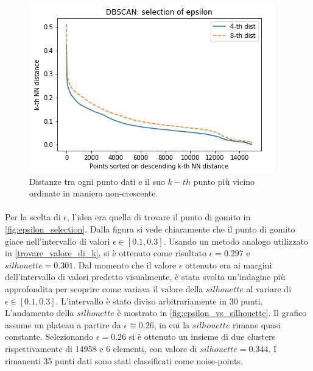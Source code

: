 \documentclass[a4paper]{article}
\begin{document}
\begin{figure}[hbtp]
\centering
\includegraphics[width=0.45\columnwidth]{../images/dbscan_epsilon_selection.png}
\caption{Distanze tra ogni punto dati e il suo $k-th$ punto più vicino ordinate in maniera non-crescente.}
\label{fig:epsilon_selection}
\end{figure}

\paragraph{}
Per la scelta di $\epsilon$, l'idea era quella di trovare il punto di gomito in \autoref{fig:epsilon_selection}. Dalla figura si vede chiaramente che il punto di gomito giace nell'intervallo di valori $\epsilon \in \left[0.1, 0.3\right]$. Usando un metodo analogo utilizzato in \autoref{trovare_valore_di_k}, si è ottenuto come risultato $\epsilon=0.297$ e $silhouette=0.301$. Dal momento che il valore $\epsilon$ ottenuto era ai margini dell'intervallo di valori predetto visualmente, è stata svolta un'indagine più approfondita per scoprire come variava il valore della $silhouette$ al variare di $\epsilon \in \left[0.1, 0.3\right]$. L'intervallo è stato diviso arbitrariamente in 30 punti. L'andamento della $silhouette$ è mostrato in \autoref{fig:epsilon_vs_silhouette}. Il grafico assume un plateau a partire da $\epsilon \cong 0.26$, in cui la $silhouette$ rimane quasi constante. Selezionando $\epsilon=0.26$ si è ottenuto un insieme di due clusters rispettivamente di 14958 e 6 elementi, con valore di $silhouette=0.344$. I rimanenti 35 punti dati sono stati classificati come noise-points. 
\end{document}
